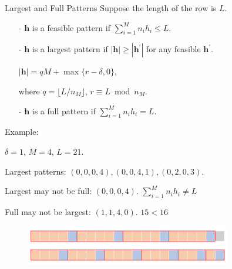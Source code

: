   \begin{frame}{Largest and Full Patterns}
    Suppose the length of the row is $L$.
    \begin{itemize}
      \item[-] $\bm{h}$ is a feasible pattern if $\sum_{i=1}^{M} n_i h_i \leq L$.
      \item[-] $\bm{h}$ is a largest pattern if $|\bm{h}| \geq |\bm{h}^{\prime}|$ for any feasible $\bm{h}^{\prime}$.
      
      $|\bm{h}| = qM + \max\{r-\delta, 0\}$, 
      
      where $q = \lfloor L/n_M \rfloor$, $r \equiv L \bmod n_M$.
      \item[-] $\bm{h}$ is a full pattern if $\sum_{i=1}^{M} n_i h_i = L$.  
    \end{itemize}

     {\color{green} Example}: 
      
      $\delta = 1$, $M =4$, $L = 21$.
      
      Largest patterns: $(0, 0, 0, 4), (0, 0, 4, 1), (0, 2, 0, 3)$.

      Largest may not be full: $(0, 0, 0, 4)$. $\sum_{i=1}^{M} n_i h_i \neq L$

      Full may not be largest: $(1, 1, 4, 0)$. $15 < 16$

      \begin{figure}[ht]
        \centering
        \includegraphics[width = 0.8\textwidth]{./images/full_largest.png}
      \end{figure}
  \end{frame}